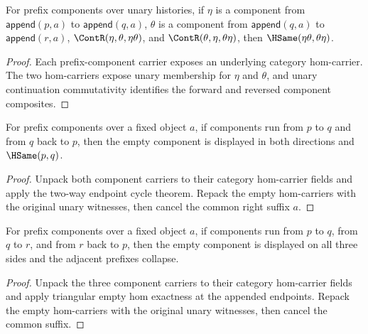 \begin{theorem}
\label{thm:nattrans-prefix-component-carrier-tail-comm-hsame}
For prefix components over unary histories, if \(\eta\) is a component from
\(\mathsf{append}(p,a)\) to \(\mathsf{append}(q,a)\), \(\theta\) is a component
from \(\mathsf{append}(q,a)\) to \(\mathsf{append}(r,a)\),
\(\ContR(\eta,\theta,\eta\theta)\), and
\(\ContR(\theta,\eta,\theta\eta)\), then
\(\HSame(\eta\theta,\theta\eta)\).
\end{theorem}
\begin{proof}
Each prefix-component carrier exposes an underlying category hom-carrier. The
two hom-carriers expose unary membership for \(\eta\) and \(\theta\), and unary
continuation commutativity identifies the forward and reversed component
composites.
\end{proof}

\begin{theorem}
\label{thm:nattrans-prefix-component-vert-cycle-empty-components}
For prefix components over a fixed object $a$, if components run from $p$ to $q$
and from $q$ back to $p$, then the empty component is displayed in both
directions and $\HSame(p,q)$.
\end{theorem}
\begin{proof}
Unpack both component carriers to their category hom-carrier fields and apply
the two-way endpoint cycle theorem. Repack the empty hom-carriers with the
original unary witnesses, then cancel the common right suffix $a$.
\end{proof}

\begin{theorem}
\label{thm:nattrans-prefix-component-vert-triangle-cycle-empty-components}
For prefix components over a fixed object $a$, if components run from $p$ to
$q$, from $q$ to $r$, and from $r$ back to $p$, then the empty component is
displayed on all three sides and the adjacent prefixes collapse.
\end{theorem}
\begin{proof}
Unpack the three component carriers to their category hom-carrier fields and
apply triangular empty hom exactness at the appended endpoints. Repack the empty
hom-carriers with the original unary witnesses, then cancel the common suffix.
\end{proof}

